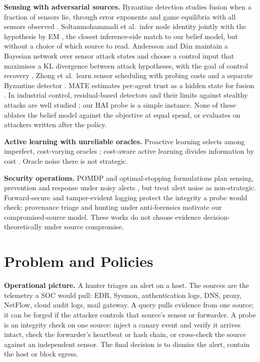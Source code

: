 \documentclass[conference]{IEEEtran}
\begin{document}
\textbf{Sensing with adversarial sources.} Byzantine detection studies fusion when a fraction of sensors lie, through
error exponents and game equilibria with all sensors observed \cite{marano2009,li2021byz}. Soltanmohammadi et al.\
infer node identity jointly with the hypothesis by EM \cite{soltanmohammadi2012}, the closest inference-side match to
our belief model, but without a choice of which source to read. Andersson and D\'an maintain a Bayesian network over
sensor attack states and choose a control input that maximises a KL divergence between attack hypotheses, with the goal
of control recovery \cite{andersson2026}. Zhong et al.\ learn sensor scheduling with probing costs and a separate
Byzantine detector \cite{zhong2025}. MATE estimates per-agent trust as a hidden state for fusion \cite{hallyburton2025}.
In industrial control, residual-based detectors and their limits against stealthy attacks are well studied
\cite{urbina2016}; our HAI probe is a simple instance. None of these ablates the belief model against the objective at
equal spend, or evaluates on attackers written after the policy.

\textbf{Active learning with unreliable oracles.} Proactive learning selects among imperfect, cost-varying oracles
\cite{donmez2008}; cost-aware active learning divides information by cost \cite{settles2008,settles2009}. Oracle noise
there is not strategic.

\textbf{Security operations.} POMDP and optimal-stopping formulations plan sensing, prevention and response under noisy
alerts \cite{mccarthy2016,miehling2018,hammar2021}, but treat alert noise as non-strategic. Forward-secure and
tamper-evident logging \cite{schneier1999,custos2020} protect the integrity a probe would check; provenance triage
\cite{nodoze2019} and hunting under anti-forensics \cite{hunteragent2026} motivate our compromised-source model. These
works do not choose evidence decision-theoretically under source compromise.

\section{Problem and Policies}\label{sec:model}

\textbf{Operational picture.} A hunter triages an alert on a host. The sources are the telemetry a SOC would pull: EDR,
Sysmon, authentication logs, DNS, proxy, NetFlow, cloud audit logs, mail gateway. A query pulls evidence from one
source; it can be forged if the attacker controls that source's sensor or forwarder. A probe is an integrity check on
one source: inject a canary event and verify it arrives intact, check the forwarder's heartbeat or hash chain, or
cross-check the source against an independent sensor. The final decision is to dismiss the alert, contain the host or
block egress.
\end{document}
